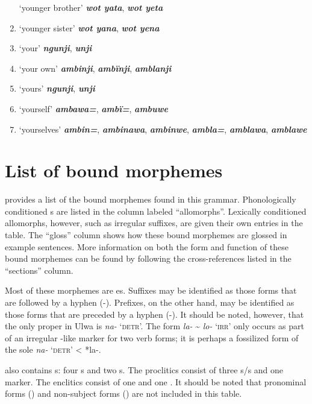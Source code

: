 \begin{enumerate}[noitemsep, label={}, align=left, widest=190, labelsep=1ex,leftmargin=*,itemindent=-10pt]
‘younger brother’ \textbf{\textit{wot yata}}, \textbf{\textit{wot yeta}} \item
‘younger sister’ \textbf{\textit{wot yana}}, \textbf{\textit{wot yena}} \item
‘your’ \textbf{\textit{ngunji}}, \textbf{\textit{unji}} \item
‘your own’ \textbf{\textit{ambinji}}, \textbf{\textit{ambïnji}}, \textbf{\textit{amblanji}} \item
‘yours’ \textbf{\textit{ngunji}}, \textbf{\textit{unji}} \item
‘yourself’ \textbf{\textit{ambawa=}}, \textbf{\textit{ambï=}}, \textbf{\textit{ambuwe}} \item
‘yourselves’ \textbf{\textit{ambin=}}, \textbf{\textit{ambinawa}}, \textbf{\textit{ambinwe}}, \textbf{\textit{ambla=}}, \textbf{\textit{amblawa}}, \textbf{\textit{amblawe}}
\end{enumerate}


\section{List of bound morphemes}\label{sec:17.3}


 provides a list of the bound morphemes found in this grammar. Phonologically  conditioned s are listed in the column labeled “allomorphs”. Lexically  conditioned allomorphs, however, such as irregular  suffixes, are given their own entries in the table. The “gloss” column shows how these bound morphemes are glossed in example sentences. More information on both the form and function of these bound morphemes can be found by following the cross-references listed in the “sections” column.

Most of these morphemes are es. Suffixes may be identified as those forms that are followed by a hyphen (-). Prefixes, on the other hand, may be identified as those forms that are preceded by a hyphen (-). It should be noted, however, that the only proper  in Ulwa is \textit{na-} ‘\textsc{detr}’. The form \textit{la-} {\textasciitilde} \textit{lo-} ‘\textsc{irr}’ only occurs as part of an irregular -like marker for two verb forms; it is perhaps a  fossilized form of the sole  \textit{na-} ‘\textsc{detr}’ < *la-.

 also contains s: four s and two s. The proclitics consist of three s/s and one  marker. The enclitics consist of one  and one . It should be noted that  pronominal  forms () and non-subject  forms () are not included in this table.

